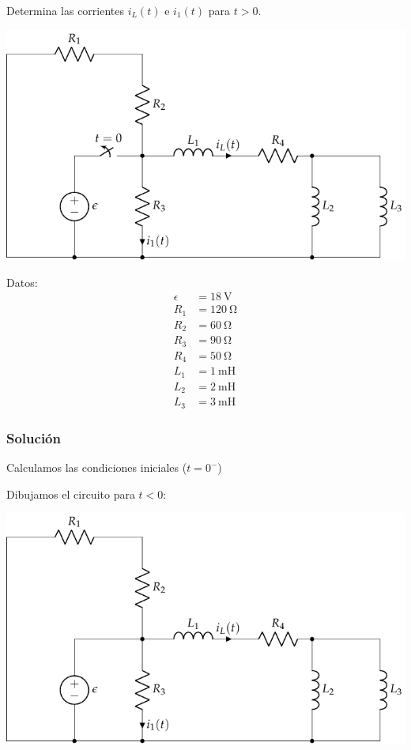 \documentclass[12pt]{article}
\begin{document}
Determina las corrientes $i_L(t)$ e $i_1(t)$ para $t > 0$.

\begin{minipage}{0.7\textwidth}
  \includegraphics{figs/HKD84}
\end{minipage}
\hfill
\begin{minipage}{0.3\textwidth}
  Datos:
  \begin{align*}
    \epsilon &= \SI{18}{\volt}\\
    R_1 &= \SI{120}{\ohm}\\
    R_2 &= \SI{60}{\ohm}\\
    R_3 &= \SI{90}{\ohm}\\
    R_4 &= \SI{50}{\ohm}\\
    L_1 &= \SI{1}{\milli\henry}\\
    L_2 &= \SI{2}{\milli\henry}\\
    L_3 &= \SI{3}{\milli\henry}
  \end{align*}
\end{minipage}

\subsubsection*{Solución}

Calculamos las condiciones iniciales ($t = 0^-$)

Dibujamos el circuito para $t < 0$:

\begin{center}
  \includegraphics[scale=0.85]{figs/HKD84_t0-}
\end{center}
\end{document}
